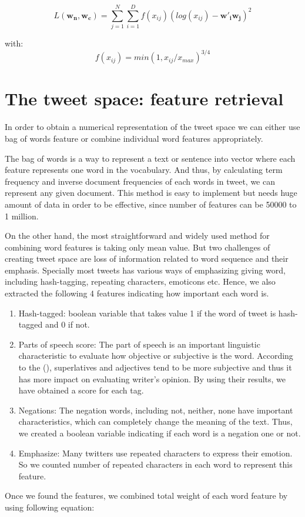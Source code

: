 \documentclass[10pt,conference,compsocconf]{IEEEtran}
\begin{document}
$$L(\textbf{w}_{\textbf{n}},\textbf{w}_{\textbf{c}})=\sum_{j=1}^{N}\sum_{i=1}^{D}f(x_{ij})(log(x_{ij})-\textbf{w}'_{\textbf{i}}\textbf{w}_{\textbf{j}})^2$$ 

with: 
$$f(x_{ij})=min(1,x_{ij}/x_{max})^{3/4}$$ 
\section{The tweet space: feature retrieval}\label{s3}
In order to obtain a numerical representation of the tweet space we can either use bag of words feature or combine individual word features appropriately.

The bag of words is a way to represent a text or sentence into vector where each feature represents one word in the vocabulary. And thus, by calculating term frequency and inverse document frequencies of each words in tweet, we can represent any given document. This method is easy to implement but needs huge amount of data in order to be effective, since number of features can be 50000 to 1 million. 

On the other hand, the most straightforward and widely used method for combining word features is taking only mean value. But two challenges of creating tweet space are loss of information related to word sequence and their emphasis. Specially most tweets has various ways of emphasizing giving word, including hash-tagging, repeating characters, emoticons etc. Hence, we also extracted the following 4 features indicating how important each word is.
\begin{enumerate}
\item Hash-tagged: boolean variable that takes value 1 if the word of tweet is hash-tagged and 0 if not. 
\item Parts of speech score: The part of speech is an important linguistic characteristic to evaluate how objective or subjective is the word. According to the (\cite{corpus}), superlatives and adjectives tend to be more subjective and thus it has more impact on evaluating writer's opinion. By using their results, we have obtained a score for each tag.
\item Negations: The negation words, including not, neither, none have important characteristics, which can completely change the meaning of the text. Thus, we created a boolean variable indicating if each word is a negation one or not. 
\item Emphasize: Many twitters use repeated characters to express their emotion. So we counted number of repeated characters in each word to represent this feature.
\end{enumerate}
Once we found the features, we combined total weight of each word feature by using following equation:
\end{document}
